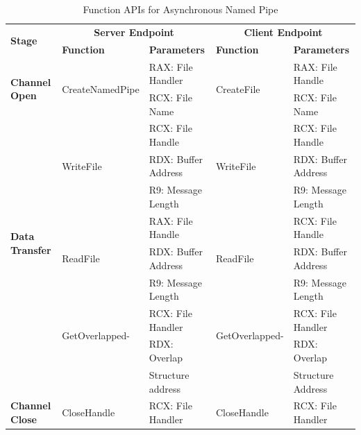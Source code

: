     \begin{table}[H]
        \centering
        \caption{Function APIs for Asynchronous Named Pipe}
        \label{asynfunctions}
        \begin{tabular}{|l|l|l|l|l|}
            \hline
             \multirow{2}{*}{\textbf{Stage}} &
               \multicolumn{2}{c|}{\textbf{Server Endpoint}} &
               \multicolumn{2}{c|}{\textbf{Client Endpoint}} \\
             \cline{2-5}
              & \textbf{Function}& \textbf{Parameters} & \textbf{Function} & \textbf{Parameters}  \\
             \hline
             \multirow{2}{*}{{\textbf{Channel Open}}}
             &\multirow{2}{*}{{CreateNamedPipe}} &  RAX: File Handler & \multirow{2}{*}{CreateFile} &  RAX: File Handle\\
              \cline{3-3} \cline{5-5}
             &&  RCX: File Name &  &  RCX: File Name\\
            \hline
             \multirow{8}{*}{{\textbf{Data Transfer}}}
             &\multirow{3}{*}{WriteFile} &  RCX: File Handle & \multirow{3}{*}{WriteFile} &  RCX: File Handle\\
              \cline{3-3} \cline{5-5}
             &&  RDX: Buffer Address &  &  RDX: Buffer Address\\
                           \cline{3-3} \cline{5-5}
             & &  R9: Message Length &  &  R9: Message Length\\
            \cline{2-5} 

             & \multirow{3}{*}{ReadFile}&  RAX: File Handle & \multirow{3}{*}{ReadFile} &  RCX: File Handle\\
              \cline{3-3} \cline{5-5}
              &&  RDX: Buffer Address &  &  RDX: Buffer Address\\
                           \cline{3-3} \cline{5-5}
             & &  R9: Message Length &  &  R9: Message Length\\
              \cline{2-5} 
             & \multirow{2}{*}{GetOverlapped-}&  RCX: File Handler & \multirow{2}{*}{GetOverlapped-} &  RCX: File Handler\\
              \cline{3-3} \cline{5-5}
             &  \multirow{2}{*}{Result} &  RDX:  Overlap  &  \multirow{2}{*}{Result }&  RDX:  Overlap \\
              &  &  Structure address &  &  Structure Address\\
            \hline                       
            \textbf{Channel Close}
             &{CloseHandle} &{RCX: File Handler} & {CloseHandle} &  {RCX: File Handler}\\
            \hline
        \end{tabular}
    \end{table}
    


